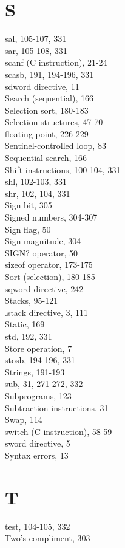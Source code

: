 \documentclass[10pt]{article}
\begin{document}
\section*{S}
sal, 105-107, 331\\
sar, 105-108, 331\\
scanf (C instruction), 21-24\\
scasb, 191, 194-196, 331\\
sdword directive, 11\\
Search (sequential), 166\\
Selection sort, 180-183\\
Selection structures, 47-70\\
floating-point, 226-229\\
Sentinel-controlled loop, 83\\
Sequential search, 166\\
Shift instructions, 100-104, 331\\
shl, 102-103, 331\\
shr, 102, 104, 331\\
Sign bit, 305\\
Signed numbers, 304-307\\
Sign flag, 50\\
Sign magnitude, 304\\
SIGN? operator, 50\\
sizeof operator, 173-175\\
Sort (selection), 180-185\\
sqword directive, 242\\
Stacks, 95-121\\
.stack directive, 3, 111\\
Static, 169\\
std, 192, 331\\
Store operation, 7\\
stosb, 194-196, 331\\
Strings, 191-193\\
sub, 31, 271-272, 332\\
Subprograms, 123\\
Subtraction instructions, 31\\
Swap, 114\\
switch (C instruction), 58-59\\
sword directive, 5\\
Syntax errors, 13

\section*{T}
test, 104-105, 332\\
Two's compliment, 303
\end{document}
